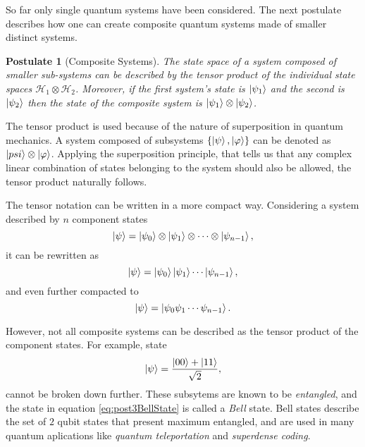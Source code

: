 \documentclass[../../dissertation.tex]{subfiles}
\newtheorem{post}{Postulate}
\begin{document}
So far only single quantum systems have been considered. The next postulate
describes how one can create composite quantum systems made of smaller distinct
systems.
\begin{post}[Composite Systems]
	The state space of a system composed of smaller sub-systems can be
	described by the tensor product of the individual state spaces
	$\mathcal{H}_1\otimes\mathcal{H}_2$. Moreover, if the first system's
	state is $\ket{\psi_1}$ and the second is $\ket{\psi_2}$ then the state
	of the composite system is $\ket{\psi_1} \otimes \ket{\psi_2}$.  
\end{post}\par
The tensor product is used because of the nature of superposition in quantum
mechanics. A system composed of subsystems $\{\ket{\psi},\ket{\varphi}\}$ can
be denoted as $\ket{psi}\otimes\ket{\varphi}$. Applying the superposition principle,
that tells us that any complex linear combination of states belonging to the
system should also be allowed, the tensor product naturally follows.\par
The tensor notation can be written in a more compact way. Considering a system
described by $n$ component states \begin{equation}
	\ket{\psi} = \ket{\psi_0} \otimes \ket{\psi_1} \otimes \cdots \otimes \ket{\psi_{n-1}},
\end{equation}
it can be rewritten as 
\begin{equation}
	\ket{\psi} = \ket{\psi_0}\ket{\psi_1} \cdots \ket{\psi_{n-1}},
\end{equation}
and even further compacted to
\begin{equation}
	\ket{\psi} = \ket{\psi_0 \psi_1 \cdots \psi_{n-1}}.
\end{equation}\par
However, not all composite systems can be described as the tensor product of
the component states. For example, state 
\begin{equation}
	\label{eq:post3BellState}
	\ket{\psi} = \frac{\ket{00} +\ket{11}}{\sqrt{2}}, 
\end{equation}
cannot be broken down further. These subsytems are known to be
\textit{entangled}, and the state in equation \ref{eq:post3BellState} is called
a \textit{Bell} state. Bell states describe the set of $2$ qubit states that
present maximum entangled, and are used in many quantum aplications like
\textit{quantum teleportation} and \textit{superdense coding}.\par
\end{document}
